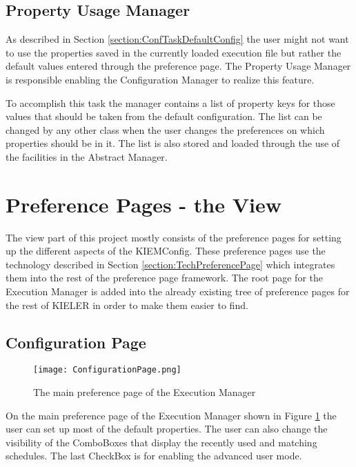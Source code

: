 \subsection{Property Usage Manager}
\label{section:Property Usage Manager}
As described in Section \ref{section:ConfTaskDefaultConfig} the user might not want to use
the properties saved in the currently loaded execution file but rather the default values
entered through the preference page. The Property Usage Manager is responsible enabling
the Configuration Manager to realize this feature.

To accomplish this task the manager contains a list of property keys for those values
that should be taken from the default configuration. The list can be changed by any other
class when the user changes the preferences on which properties should be in it. The list
is also stored and loaded through the use of the facilities in the Abstract Manager.


\section{Preference Pages - the View}
\label{section:ConfView}
The view part of this project mostly consists of the preference pages for setting up the different
aspects of the \ac{KIEMConfig}. These preference pages use the technology described in Section
\ref{section:TechPreferencePage} which integrates them into the rest of the preference page
framework. The root page for the Execution Manager is added into the already existing tree
of preference pages for the rest of \ac{KIELER} in order to make them easier to find.

\subsection{Configuration Page}
\label{section:ConfigurationPage}
\begin{figure}[Configuration Page]
  \centering
  \texttt{[image: ConfigurationPage.png]}
  \caption[The main preference page of the Execution Manager]%
  {The main preference page of the Execution Manager\protect}
  \label{fig:ConfigurationPage}
\end{figure}
On the main preference page of the Execution Manager shown in Figure \ref{fig:ConfigurationPage} the user can
set up most of the default properties. The user can also change the visibility of the ComboBoxes that display
the recently used and matching schedules. The last CheckBox is for enabling the advanced user mode.


